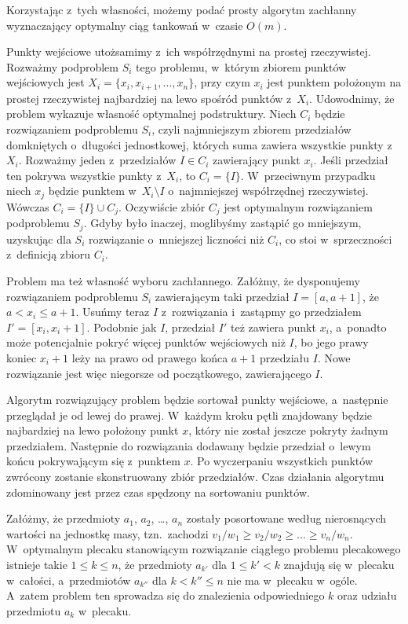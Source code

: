 Korzystając z~tych własności, możemy podać prosty algorytm zachłanny wyznaczający optymalny ciąg tankowań w~czasie $O(m)$.

\exercise %

\noindent Punkty wejściowe utożsamimy z~ich współrzędnymi na prostej rzeczywistej.
Rozważmy podproblem $S_i$ tego problemu, w~którym zbiorem punktów wejściowych jest $X_i=\{x_i,x_{i+1},\dots,x_n\}$, przy czym $x_i$ jest punktem położonym na prostej rzeczywistej najbardziej na lewo spośród punktów z~$X_i$.
Udowodnimy, że problem wykazuje własność optymalnej podstruktury.
Niech $C_i$ będzie rozwiązaniem podproblemu $S_i$, czyli najmniejszym zbiorem przedziałów domkniętych o~długości jednostkowej, których suma zawiera wszystkie punkty z~$X_i$.
Rozważmy jeden z~przedziałów $I\in C_i$ zawierający punkt $x_i$.
Jeśli przedział ten pokrywa wszystkie punkty z~$X_i$, to $C_i=\{I\}$.
W~przeciwnym przypadku niech $x_j$ będzie punktem w~$X_i\setminus I$ o~najmniejszej współrzędnej rzeczywistej.
Wówczas $C_i=\{I\}\cup C_j$.
Oczywiście zbiór $C_j$ jest optymalnym rozwiązaniem podproblemu $S_j$.
Gdyby było inaczej, moglibyśmy zastąpić go mniejszym, uzyskując dla $S_i$ rozwiązanie o~mniejszej liczności niż $C_i$, co stoi w~sprzeczności z~definicją zbioru $C_i$.

Problem ma też własność wyboru zachłannego.
Załóżmy, że dysponujemy rozwiązaniem podproblemu $S_i$ zawierającym taki przedział $I=[a,a+1]$, że $a<x_i\le a+1$.
Usuńmy teraz $I$ z~rozwiązania i~zastąpmy go przedziałem $I'=[x_i,x_i+1]$.
Podobnie jak $I$, przedział $I'$ też zawiera punkt $x_i$, a~ponadto może potencjalnie pokryć więcej punktów wejściowych niż $I$, bo jego prawy koniec $x_i+1$ leży na prawo od prawego końca $a+1$ przedziału $I$.
Nowe rozwiązanie jest więc niegorsze od początkowego, zawierającego $I$.

Algorytm rozwiązujący problem będzie sortował punkty wejściowe, a~następnie przeglądał je od lewej do prawej.
W~każdym kroku pętli znajdowany będzie najbardziej na lewo położony punkt $x$, który nie został jeszcze pokryty żadnym przedziałem.
Następnie do rozwiązania dodawany będzie przedział o~lewym końcu pokrywającym się z~punktem $x$.
Po wyczerpaniu wszystkich punktów zwrócony zostanie skonstruowany zbiór przedziałów.
Czas działania algorytmu zdominowany jest przez czas spędzony na sortowaniu punktów.

\exercise %
Załóżmy, że przedmioty $a_1$, $a_2$, \dots, $a_n$ zostały posortowane według nierosnących wartości na jednostkę masy, tzn.\ zachodzi $v_1/w_1\ge v_2/w_2\ge\dots\ge v_n/w_n$.
W~optymalnym plecaku stanowiącym rozwiązanie ciągłego problemu plecakowego istnieje takie $1\le k\le n$, że przedmioty $a_{k'}$ dla $1\le k'<k$ znajdują się w~plecaku w~całości, a~przedmiotów $a_{k''}$ dla $k<k''\le n$ nie ma w~plecaku w~ogóle.
A~zatem problem ten sprowadza się do znalezienia odpowiedniego $k$ oraz udziału przedmiotu $a_k$ w~plecaku.

